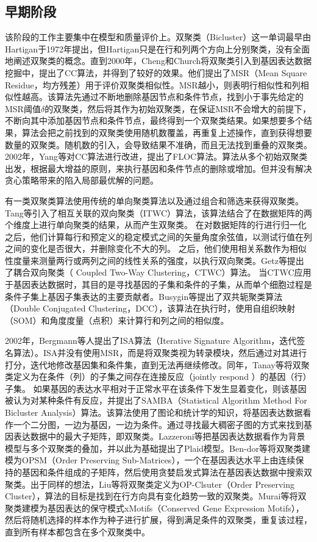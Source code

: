     \subsection{早期阶段}
    该阶段的工作主要集中在模型和质量评价上。双聚类（Bicluster）这一单词最早由Hartigan\cite{hartigan1972direct}于1972年提出，但Hartigan只是在行和列两个方向上分别聚类，没有全面地阐述双聚类的概念。直到2000年，Cheng和Church\cite{cc}将双聚类引入到基因表达数据挖掘中，提出了CC算法，并得到了较好的效果。他们提出了MSR（Mean Square Residue，均方残差）用于评价双聚类相似性。MSR越小，则表明行相似性和列相似性越高。该算法先通过不断地删除基因节点和条件节点，找到小于事先给定的MSR阈值$\delta$的双聚类，然后将其作为初始双聚类，在保证MSR不会增大的前提下，不断向其中添加基因节点和条件节点，最终得到一个双聚类结果。如果想要多个结果，算法会把之前找到的双聚类使用随机数覆盖，再重复上述操作，直到获得想要数量的双聚类。随机数的引入，会导致结果不准确，而且无法找到重叠的双聚类。2002年，Yang\cite{floc}等对CC算法进行改进，提出了FLOC算法。算法从多个初始双聚类出发，根据最大增益的原则，来执行基因和条件节点的删除或增加。但并没有解决贪心策略带来的陷入局部最优解的问题。

    有一类双聚类算法使用传统的单向聚类算法以及通过组合和筛选来获得双聚类。Tang\cite{tang2001interrelated}等引入了相互关联的双向聚类（ITWC）算法，该算法结合了在数据矩阵的两个维度上进行单向聚类的结果，从而产生双聚类。 在对数据矩阵的行进行归一化之后，他们计算每行和预定义的稳定模式之间的矢量角度余弦值，以测试行值在列之间的变化是否很大，并删除变化不大的列。 之后，他们使用相关系数作为相似性度量来测量两行或两列之间的线性关系的强度，以执行双向聚类。Getz\cite{getz2000coupled}等提出了耦合双向聚类（ Coupled Two-Way Clustering，CTWC）算法。 当CTWC应用于基因表达数据时，其目的是寻找基因的子集和条件的子集，从而单个细胞过程是条件子集上基因子集表达的主要贡献者。Busygin\cite{busygin2002double}等提出了双共轭聚类算法（Double Conjugated Clustering，DCC），该算法在执行时，使用自组织映射（SOM）和角度度量（点积）来计算行和列之间的相似度。

    2002年，Bergmann\cite{isa}等人提出了ISA算法（Iterative Signature Algorithm，迭代签名算法）。ISA并没有使用MSR，而是将双聚类视为转录模块，然后通过对其进行打分，迭代地修改基因集和条件集，直到无法再继续修改。同年，Tanay\cite{tanay2002}等将双聚类定义为在条件（列）的子集之间存在连接反应（jointly respond ）的基因（行）子集。 如果基因的表达水平相对于正常水平在该条件下发生显着变化，则该基因被认为对某种条件有反应，并提出了SAMBA（Statistical Algorithm Method For Bicluster Analysis）算法。该算法使用了图论和统计学的知识，将基因表达数据看作一个二分图，一边为基因，一边为条件。通过寻找最大稠密子图的方式来找到基因表达数据中的最大子矩阵，即双聚类。Lazzeroni\cite{plaid}等把基因表达数据看作为背景模型与多个双聚类的叠加，并以此为基础提出了Plaid模型。Ben-dor\cite{ben2002discovering}等将双聚类建模为OPSM（Order Preserving Sub-Matrices），一个在基因表达水平上由连续保持的基因和条件组成的子矩阵，然后使用贪婪启发式算法在基因表达数据中搜索双聚类。出于同样的想法，Liu\cite{liu2003op}等将双聚类定义为OP-Clsuter（Order Preserving Cluster），算法的目标是找到在行方向具有变化趋势一致的双聚类。Murai\cite{murali2002extracting}等将双聚类建模为基因表达的保守模式xMotifs（Conserved Gene Expression Motifs），然后将随机选择的样本作为种子进行扩展，得到满足条件的双聚类，重复该过程，直到所有样本都包含在多个双聚类中。

